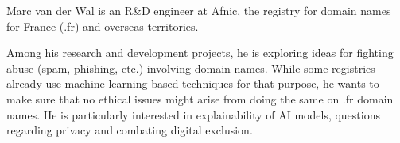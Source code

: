 \documentclass[journal]{IEEEtran}
\begin{document}
\begin{IEEEbiographynophoto}{Marc van der Wal}
  is an  R\&D engineer  at Afnic,  the registry  for domain  names for
  France (.fr) and overseas territories.

  Among his research and development projects, he is exploring ideas for
  fighting abuse (spam, phishing, etc.) involving domain names. While some
  registries already use machine learning-based techniques for that purpose,
  he wants to make sure that no ethical issues might arise from doing the same
  on .fr domain names. He is particularly interested in explainability of AI
  models, questions regarding privacy and combating digital exclusion.
\end{IEEEbiographynophoto}
\end{document}
